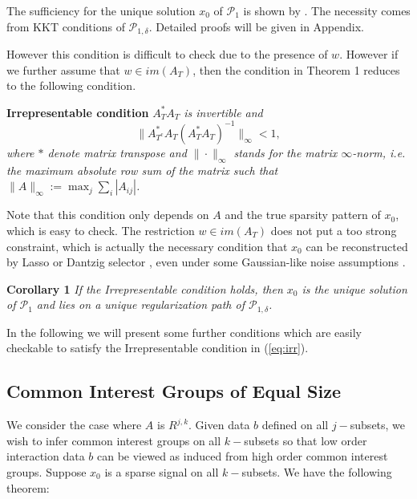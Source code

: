 \documentclass{article}
\begin{document}
The sufficiency for the unique solution $x_0$ of $\mathcal{P}_1$ is shown by \cite{CanTao05}.
The necessity comes from KKT conditions of $\mathcal{P}_{1,\delta}$. Detailed proofs will be given in Appendix. 

However this condition is difficult to check due to the presence of $w$. However if we further assume that $w\in im(A_T)$, then the condition in Theorem 1 reduces to the following condition. 

\textbf{Irrepresentable condition} {\it $A^*_TA_T$ is invertible and 
\begin{equation} \label{eq:irr}
\|A^*_{T^c}A_T(A^*_TA_T)^{-1}\|_\infty<1,
\end{equation}
where $*$ denote matrix transpose and  $\|\cdot \|_\infty$ stands for the matrix $\infty$-norm, i.e. the maximum absolute row sum of the matrix such that $\|A\|_\infty := \max_j \sum_i |A_{ij}|$. }

Note that this condition only depends on $A$ and the true sparsity pattern of $x_0$, which is easy to check. The restriction $w\in im(A_T)$ does not put a too strong constraint, which is actually the necessary condition that $x_0$ can be reconstructed by Lasso \cite{Tib96-Lasso} or Dantzig selector \cite{CanTao07-Dantzig}, even under some Gaussian-like noise assumptions \cite{ZhaYu06,YuaLin07}. 


\textbf{Corollary 1} {\it If the Irrepresentable condition holds, then $x_0$ is the unique solution of $\mathcal{P}_1$ and lies on a unique regularization path of $\mathcal{P}_{1,\delta}$. }

In the following we will present some further conditions which are easily checkable to satisfy the Irrepresentable condition in (\ref{eq:irr}).

\subsection{Common Interest Groups of Equal Size}
We consider the case where $A$ is $R^{j,k}$. Given data $b$ defined on
all $j-$subsets, we wish to infer common interest groups on all $k-$subsets so that
low order interaction data $b$ can be viewed as induced from high order common interest groups.
Suppose $x_0$ is a sparse signal on all $k-$subsets. We have the following theorem:
\end{document}

